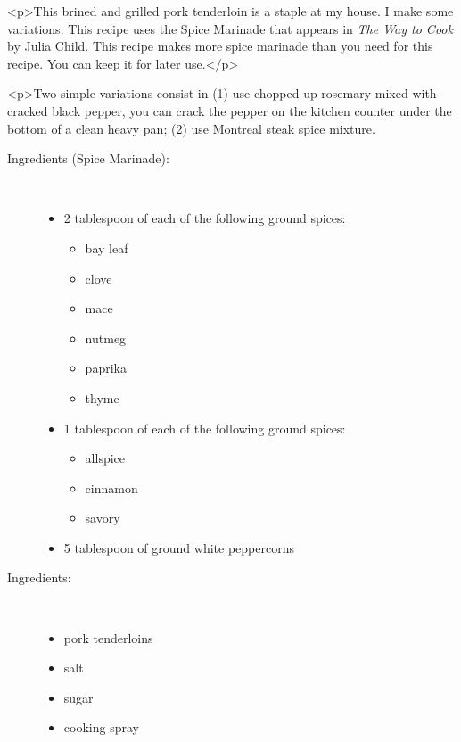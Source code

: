 \documentclass[11pt,letterpaper]{article}
\begin{document}


 
 <p>This brined and grilled pork tenderloin is a staple at my house. I make some variations. This recipe uses the Spice Marinade that appears in {\it The Way to Cook} by Julia Child. This  recipe makes more spice marinade than you need for this recipe. You can keep it for later use.</p>
 
 <p>Two simple variations consist in (1) use chopped up rosemary mixed with cracked black pepper, you can crack the pepper on the kitchen counter under the bottom of a clean heavy pan; (2) use Montreal steak spice mixture.
 
\begin{description}

\item[Ingredients (Spice Marinade):]\ \\
	\begin{itemize}
	\item 2 tablespoon of each of the following ground spices:
		\begin{itemize}
		\item bay leaf
		\item clove
		\item mace
		\item nutmeg
		\item paprika
		\item thyme
		\end{itemize}
	\item 1 tablespoon of each of the following ground spices:
		\begin{itemize}
		\item allspice
		\item cinnamon
		\item savory
		\end{itemize}
	\item 5 tablespoon of ground white peppercorns
	\end{itemize}

\item[Ingredients:]\ \\
	\begin{itemize}
	\item pork tenderloins
	\item salt
	\item sugar
	\item cooking spray
	\end{itemize}


\end{description}
\end{document}

